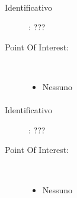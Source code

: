 \documentclass[../SperimentazioniPratiche.tex]{subfiles}
\begin{document}
			\paragraph*{}
			\label{01004}
			\begin{tcolorbox}[fonttitle=\bfseries, 
								adjusted title={\Large Beacon 01004},
								sharp corners=south,
								colback=white, 
								colframe=white!50!blue!75!black]
								
				\begin{description}
					\item[Identificativo]: ???

					\tcbline					
					
					\item[Point Of Interest:] \ \par
					\begin{itemize}
						\item Nessuno
					\end{itemize}					   				
				\end{description}  				
			\end{tcolorbox}
			
			\paragraph*{}
			\label{01005}
			\begin{tcolorbox}[fonttitle=\bfseries, 
								adjusted title={\Large Beacon 01005},
								sharp corners=south,
								colback=white, 
								colframe=white!50!blue!75!black]
								
				\begin{description}
					\item[Identificativo]: ???

					\tcbline					
					
					\item[Point Of Interest:] \ \par
					\begin{itemize}
						\item Nessuno
					\end{itemize}					   				
				\end{description}  				
			\end{tcolorbox}
			
\end{document}
